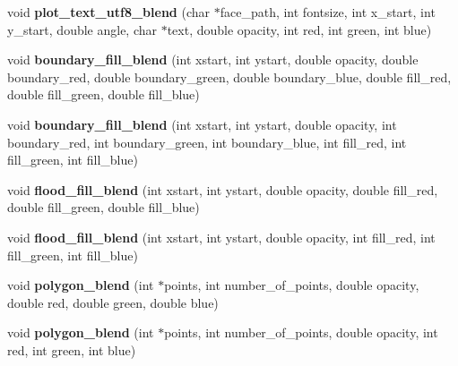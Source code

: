 \begin{DoxyCompactItemize}
\item 
\hypertarget{classpngwriter_a694b78d848424416130acbb1ce66f493}{}void {\bfseries plot\+\_\+text\+\_\+utf8\+\_\+blend} (char $\ast$face\+\_\+path, int fontsize, int x\+\_\+start, int y\+\_\+start, double angle, char $\ast$text, double opacity, int red, int green, int blue)\label{classpngwriter_a694b78d848424416130acbb1ce66f493}

\item 
\hypertarget{classpngwriter_a0615a4d6d37501e4d5c82ee3272f9e0d}{}void {\bfseries boundary\+\_\+fill\+\_\+blend} (int xstart, int ystart, double opacity, double boundary\+\_\+red, double boundary\+\_\+green, double boundary\+\_\+blue, double fill\+\_\+red, double fill\+\_\+green, double fill\+\_\+blue)\label{classpngwriter_a0615a4d6d37501e4d5c82ee3272f9e0d}

\item 
\hypertarget{classpngwriter_a55032ebcb942d532e0917b35b3b8692d}{}void {\bfseries boundary\+\_\+fill\+\_\+blend} (int xstart, int ystart, double opacity, int boundary\+\_\+red, int boundary\+\_\+green, int boundary\+\_\+blue, int fill\+\_\+red, int fill\+\_\+green, int fill\+\_\+blue)\label{classpngwriter_a55032ebcb942d532e0917b35b3b8692d}

\item 
\hypertarget{classpngwriter_a2fd9c3bdcb933e2571eb9b4e6a6610a0}{}void {\bfseries flood\+\_\+fill\+\_\+blend} (int xstart, int ystart, double opacity, double fill\+\_\+red, double fill\+\_\+green, double fill\+\_\+blue)\label{classpngwriter_a2fd9c3bdcb933e2571eb9b4e6a6610a0}

\item 
\hypertarget{classpngwriter_a38402db847497e0d921417f777990bfc}{}void {\bfseries flood\+\_\+fill\+\_\+blend} (int xstart, int ystart, double opacity, int fill\+\_\+red, int fill\+\_\+green, int fill\+\_\+blue)\label{classpngwriter_a38402db847497e0d921417f777990bfc}

\item 
\hypertarget{classpngwriter_a543d45a1ca3d3d0d9f1e8cb83ad29b92}{}void {\bfseries polygon\+\_\+blend} (int $\ast$points, int number\+\_\+of\+\_\+points, double opacity, double red, double green, double blue)\label{classpngwriter_a543d45a1ca3d3d0d9f1e8cb83ad29b92}

\item 
\hypertarget{classpngwriter_a198bf7299a1ca8756a945fe562cbc4a2}{}void {\bfseries polygon\+\_\+blend} (int $\ast$points, int number\+\_\+of\+\_\+points, double opacity, int red, int green, int blue)\label{classpngwriter_a198bf7299a1ca8756a945fe562cbc4a2}


\end{DoxyCompactItemize}
